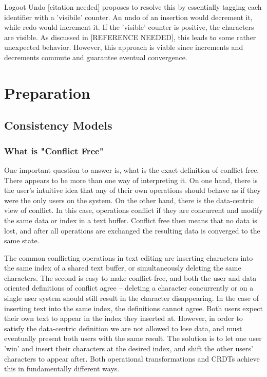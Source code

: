 \documentclass[12pt,a4paper,twoside,openright]{report}
\begin{document}
Logoot Undo [citation needed] proposes to resolve this by essentially tagging each identifier with a 'visibile' counter. An undo of an insertion would decrement it, while redo would increment it. If the 'visible' counter is positive, the characters are visible. As discussed in [REFERENCE NEEDED], this leads to some rather unexpected behavior. However, this approach is viable since increments and decrements commute and guarantee eventual convergence.


\chapter{Preparation}


\section{Consistency Models}

	\subsection{What is "Conflict Free"}
	
	One important question to answer is, what is the exact definition of conflict free. There appears to be more than one way of interpreting it. On one hand, there is the user's intuitive idea that any of their own operations should behave as if they were the only users on the system. On the other hand, there is the data-centric view of conflict. In this case, operations conflict if they are concurrent and modify the same data or index in a text buffer. Conflict free then means that no data is lost, and after all operations are exchanged the resulting data is converged to the same state.
	
	The common conflicting operations in text editing are inserting characters into the same index of a shared text buffer, or simultaneously deleting the same characters. The second is easy to make conflict-free, and both the user and data oriented definitions of conflict agree -- deleting a character concurrently or on a single user system should still result in the character disappearing. In the case of inserting text into the same index, the definitions cannot agree. Both users expect their own text to appear in the index they inserted at. However, in order to satisfy the data-centric definition we are not allowed to lose data, and must eventually present both users with the same result. The solution is to let one user 'win' and insert their characters at the desired index, and shift the other users' characters to appear after. Both operational transformations and CRDTs achieve this in fundamentally different ways.
	
\end{document}
